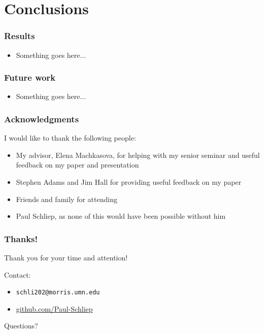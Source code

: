 \documentclass{beamer}
\newcommand{\linespace}{\vskip 0.25cm}
\begin{document}
\section[Conclusions]{Conclusions}

\begin{frame}
	\frametitle{Results}
		\begin{itemize}
			\item Something goes here...
		\end{itemize}

\end{frame}

\begin{frame}
	\frametitle{Future work}
		\begin{itemize}
			\item Something goes here...
		\end{itemize}

\end{frame}

\begin{frame}
	\frametitle{Acknowledgments}
	I would like to thank the following people:
		\begin{itemize}
			\item My advisor, Elena Machkasova, for helping with my senior seminar and useful feedback on my paper and presentation
			\item Stephen Adams and Jim Hall for providing useful feedback on my paper
			\item Friends and family for attending
			\item Paul Schliep, as none of this would have been possible without him
		\end{itemize}

\end{frame}

\begin{frame}
	\frametitle{Thanks!}
	
	Thank you for your time and attention!
		
	\linespace
	\linespace
	
	Contact:  
	\begin{itemize}
		\item \texttt{schli202@morris.umn.edu}
		\item \url{github.com/Paul-Schliep}
	\end{itemize}
	
	\linespace
	\linespace
	
	\begin{center}
	{\huge Questions?}
	\end{center}
\end{frame}
\end{document}
